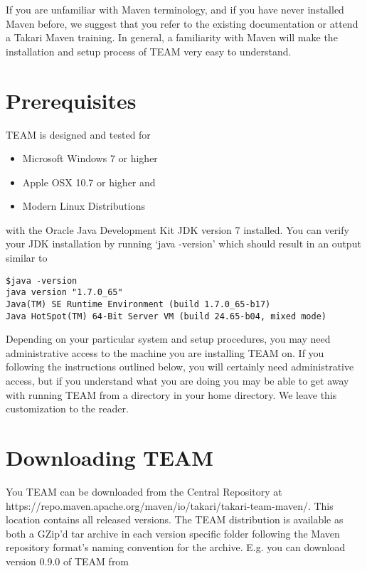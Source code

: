 \documentclass[a4paper]{book}
\begin{document}
If you are unfamiliar with Maven terminology, and if you have never installed Maven before, we suggest that you refer to the existing documentation or attend a Takari Maven training. In general, a familiarity with Maven will make the installation and setup process of TEAM very easy to understand.

\section{Prerequisites}\label{prerequisites}

TEAM is designed and tested for

\begin{itemize}
\itemsep1pt\parskip0pt
\item
  Microsoft Windows 7 or higher
\item
  Apple OSX 10.7 or higher and
\item
  Modern Linux Distributions
\end{itemize}

with the Oracle Java Development Kit JDK version 7 installed. You can verify your JDK installation by running `java -version' which should result in an output similar to

\begin{shaded}\begin{verbatim}
$java -version
java version "1.7.0_65"
Java(TM) SE Runtime Environment (build 1.7.0_65-b17)
Java HotSpot(TM) 64-Bit Server VM (build 24.65-b04, mixed mode)
\end{verbatim}\end{shaded}

Depending on your particular system and setup procedures, you may need administrative access to the machine you are installing TEAM on. If you following the instructions outlined below, you will certainly need administrative access, but if you understand what you are doing you may be able to get away with running TEAM from a directory in your home directory. We leave this customization to the reader.

\section{Downloading TEAM}\label{downloading-team}

You TEAM can be downloaded from the Central Repository at https://repo.maven.apache.org/maven/io/takari/takari-team-maven/. This location contains all released versions. The TEAM distribution is available as both a GZip'd tar archive in each version specific folder following the Maven repository format's naming convention for the archive. E.g. you can download version 0.9.0 of TEAM from
\end{document}
